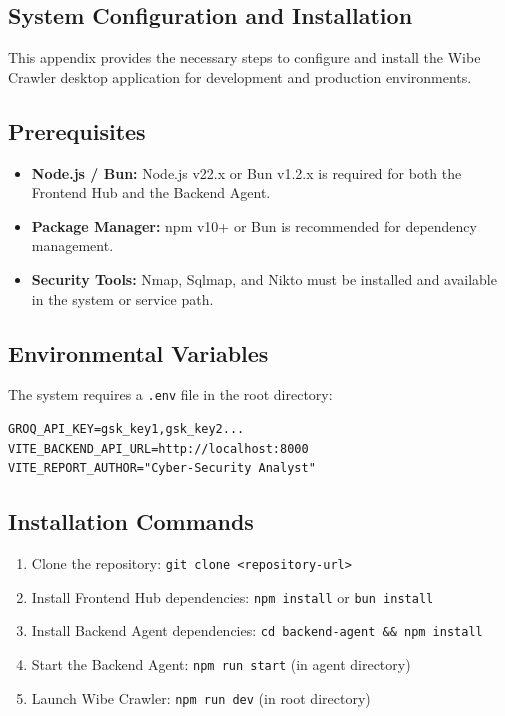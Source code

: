 \documentclass[12pt,oneside,a4paper]{book}
\begin{document}
\begin{appendices}

\chapter{System Configuration and Installation}
\label{app:config}

This appendix provides the necessary steps to configure and install the Wibe Crawler desktop application for development and production environments.

\section{Prerequisites}
\begin{itemize}
    \item \textbf{Node.js / Bun:} Node.js v22.x or Bun v1.2.x is required for both the Frontend Hub and the Backend Agent.
    \item \textbf{Package Manager:} npm v10+ or Bun is recommended for dependency management.
    \item \textbf{Security Tools:} Nmap, Sqlmap, and Nikto must be installed and available in the system or service path.
\end{itemize}

\section{Environmental Variables}
The system requires a \texttt{.env} file in the root directory:
\begin{verbatim}
GROQ_API_KEY=gsk_key1,gsk_key2...
VITE_BACKEND_API_URL=http://localhost:8000
VITE_REPORT_AUTHOR="Cyber-Security Analyst"
\end{verbatim}

\section{Installation Commands}
\begin{enumerate}
    \item Clone the repository: \texttt{git clone <repository-url>}
    \item Install Frontend Hub dependencies: \texttt{npm install} or \texttt{bun install}
    \item Install Backend Agent dependencies: \texttt{cd backend-agent \&\& npm install}
    \item Start the Backend Agent: \texttt{npm run start} (in agent directory)
    \item Launch Wibe Crawler: \texttt{npm run dev} (in root directory)
\end{enumerate}


\end{appendices}
\end{document}

